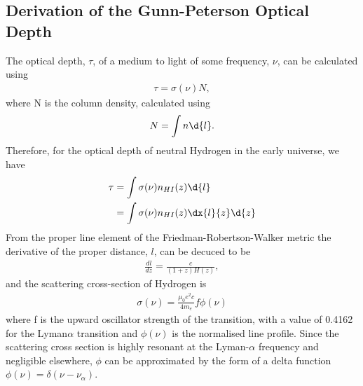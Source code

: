 	\subsection{Derivation of the Gunn-Peterson Optical Depth} %
	\label{sub:derivation_of_the_gunn_peterson_optical_depth}
		The optical depth, $\tau$, of a medium to light of some frequency, $\nu$, can be calculated using
		\begin{align}
			\tau = \sigma(\nu) N ,
		\end{align}
		where N is the column density, calculated using
		\begin{align}
			N = \int n \d{l} .
		\end{align}
		Therefore, for the optical depth of neutral Hydrogen in the early universe, we have
		\begin{align}
			\tau &= \int{} \sigma ( \nu ) n_{HI}(z) \d{l} \\
		        &= \int{} \sigma ( \nu ) n_{HI}(z) \dx{l}{z}\d{z}
		\end{align}
		From the proper line element of the Friedman-Robertson-Walker metric the derivative of the proper distance, $l$, can be decuced to be
		\begin{align}
			\frac{dl}{dz} = \frac{c}{(1+z) H(z)} ,
		\end{align}
		and the scattering cross-section of Hydrogen is
		\begin{align}
			\sigma (\nu) = \frac{\mu_0 e^2 c}{4 m_e} f \phi(\nu)
		\end{align}
		where f is the upward oscillator strength of the transition, with a value of 0.4162 for the Lyman$\alpha$ transition and $\phi(\nu)$ is the normalised line profile. Since the scattering cross section is highly resonant at the Lyman-$\alpha$ frequency and negligible elsewhere, $\phi$ can be approximated by the form of a delta function $\phi(\nu) = \delta (\nu - \nu_\alpha)$.

